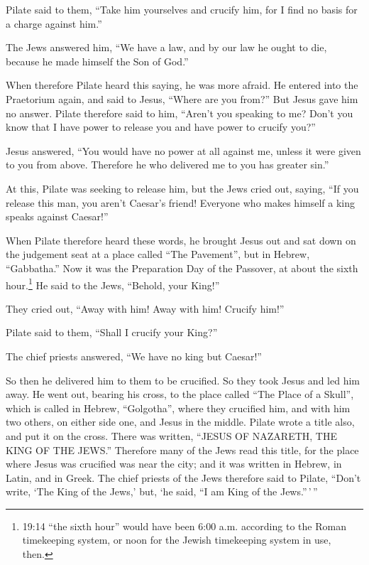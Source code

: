 Pilate said to them, ``Take him yourselves and crucify him, for I find
no basis for a charge against him.''

 The Jews answered him, ``We have a law, and by our law he
ought to die, because he made himself the Son of God.''

 When therefore Pilate heard this saying, he was more
afraid.  He entered into the Praetorium again, and said to
Jesus, ``Where are you from?'' But Jesus gave him no answer.
 Pilate therefore said to him, ``Aren't you speaking to me?
Don't you know that I have power to release you and have power to
crucify you?''

 Jesus answered, ``You would have no power at all against
me, unless it were given to you from above. Therefore he who delivered
me to you has greater sin.''

 At this, Pilate was seeking to release him, but the Jews
cried out, saying, ``If you release this man, you aren't Caesar's
friend! Everyone who makes himself a king speaks against Caesar!''

 When Pilate therefore heard these words, he brought Jesus
out and sat down on the judgement seat at a place called ``The
Pavement'', but in Hebrew, ``Gabbatha.''  Now it was the
Preparation Day of the Passover, at about the sixth hour.\footnote{19:14
  ``the sixth hour'' would have been 6:00 a.m. according to the Roman
  timekeeping system, or noon for the Jewish timekeeping system in use,
  then.} He said to the Jews, ``Behold, your King!''

 They cried out, ``Away with him! Away with him! Crucify
him!''

Pilate said to them, ``Shall I crucify your King?''

The chief priests answered, ``We have no king but Caesar!''

 So then he delivered him to them to be crucified. So they
took Jesus and led him away.  He went out, bearing his
cross, to the place called ``The Place of a Skull'', which is called in
Hebrew, ``Golgotha'',  where they crucified him, and with
him two others, on either side one, and Jesus in the middle.
 Pilate wrote a title also, and put it on the cross. There
was written, ``JESUS OF NAZARETH, THE KING OF THE JEWS.'' 
Therefore many of the Jews read this title, for the place where Jesus
was crucified was near the city; and it was written in Hebrew, in Latin,
and in Greek.  The chief priests of the Jews therefore said
to Pilate, ``Don't write, `The King of the Jews,' but, `he said, ``I am
King of the Jews.''\,'\,''

